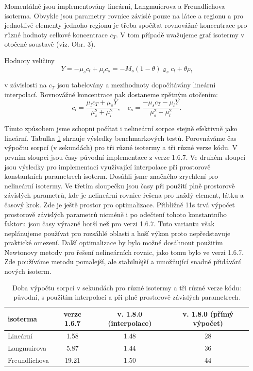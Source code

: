 \documentclass[11pt]{report}
\begin{document}
Momentálně jsou implementovány lineární, Langmuierova a Freundlichova isoterma. 
Obvykle jsou parametry rovnice závislé pouze na látce a regionu a pro 
jednotlivé elementy jednoho regionu je třeba spočítat rovnovážné koncentrace pro 
různé hodnoty celkové koncentrace $c_T$. V tom případě uvažujeme graf isotermy 
v otočené soustavě (viz. Obr. 3).

Hodnoty veličiny
\[
    Y=-\mu_s c_l + \mu_l c_s =  -M_s(1-\theta) \varrho_s c_l + \theta\rho_l 
\]

v závislosti na $c_T$ jsou tabelovány a mezihodnoty dopočítávány lineární 
interpolací. Rovnovážné koncentrace pak dostaneme zpětným otočením:
\[
    c_l = \frac{\mu_l c_T + \mu_s Y}{\mu_s^2+\mu_l^2},\quad c_s = 
\frac{-\mu_s c_T - \mu_l Y}{\mu_s^2 + \mu_l^2}.
\]

Tímto způsobem jsme schopni počítat i nelineární sorpce stejně efektivně jako 
lineární. Tabulka \ref{tab:isoterm_timing} shrnuje výsledky benchmarkových 
testů. Porovnáváme čas výpočtu sorpcí (v sekundách) pro tři různé isotermy a tři 
různé verze kódu. V prvním sloupci jsou časy původní implementace z verze 1.6.7. 
Ve druhém sloupci jsou výsledky pro implementaci využívající interpolace při 
prostorově konstantních parametrech isoterm. Dosáhli jsme značného zrychlení pro 
nelineární isotermy. Ve třetím sloupečku jsou časy při použití  plně prostorově 
závislých parametrů, kde je nelineární rovnice řešena pro každý element, látku 
a časový krok. Zde je ještě prostor pro optimalizace. Přibližně 11s trvá 
výpočet prostorově závislých parametrů nicméně i po odečtení tohoto konstantního 
faktoru jsou časy výrazně horší než pro verzi 1.6.7. Tuto variantu však 
neplánujeme používat pro rozsáhlé oblasti a hoší výkon proto nepředstavuje 
praktické omezení. Další optimalizace by bylo možné dosáhnout použitím Newtonovy 
metody pro řešení nelineárních rovnic, jako tomu bylo ve verzi 1.6.7. Zde 
používáme metodu pomalejší, ale stabilnější a umožňující snadné přidávání nových 
isoterm.

\renewcommand{\arraystretch}{1.5}
\begin{table}
\begin{center}
\begin{tabular}{|l||c|c|c|}
\hline
isoterma & verze 1.6.7 & v. 1.8.0 (interpolace) & v. 1.8.0 (přímý výpočet) \\
\hline
Lineární & 1.58        & 1.48                   & 28\\
Langmuirova & 5.87     & 1.44                   & 36\\
Freundlichova& 19.21   & 1.50                   & 44\\
\hline
\end{tabular}
\end{center}
\caption{\label{tab:isoterm_timing}
Doba výpočtu sorpcí v sekundách pro různé isotermy a tři různé verze 
kódu: původní, s použitím interpolací a při plně prostorově závislých 
parametrech.}
\end{table}
\end{document}
